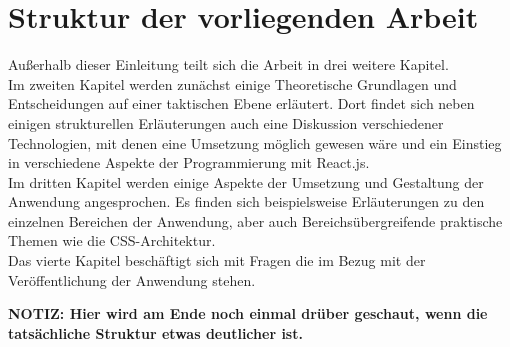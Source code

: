 \section{Struktur der vorliegenden Arbeit}
Außerhalb dieser Einleitung teilt sich die Arbeit in drei weitere Kapitel.\\
Im zweiten Kapitel werden zunächst einige Theoretische Grundlagen und Entscheidungen auf einer taktischen Ebene erläutert. Dort findet sich neben einigen strukturellen Erläuterungen auch eine Diskussion verschiedener Technologien, mit denen eine Umsetzung möglich gewesen wäre und ein Einstieg in verschiedene Aspekte der Programmierung mit React.js.\\
Im dritten Kapitel werden einige Aspekte der Umsetzung und Gestaltung der Anwendung angesprochen. Es finden sich beispielsweise Erläuterungen zu den einzelnen Bereichen der Anwendung, aber auch Bereichsübergreifende praktische Themen wie die CSS-Architektur.\\
Das vierte Kapitel beschäftigt sich mit Fragen die im Bezug mit der Veröffentlichung der Anwendung stehen.

\textbf{NOTIZ: Hier wird am Ende noch einmal drüber geschaut, wenn die tatsächliche Struktur etwas deutlicher ist.}
